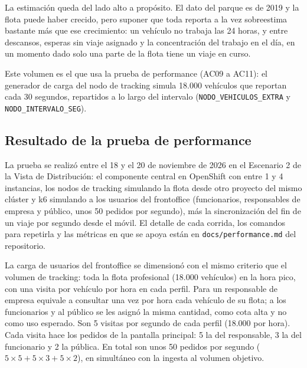 La estimación queda del lado alto a propósito. El dato del parque es de 2019 y la flota puede haber crecido, pero suponer que toda reporta a la vez sobreestima bastante más que ese crecimiento: un vehículo no trabaja las 24 horas, y entre descansos, esperas sin viaje asignado y la concentración del trabajo en el día, en un momento dado solo una parte de la flota tiene un viaje en curso.

Este volumen es el que usa la prueba de performance (AC09 a AC11): el generador de carga del nodo de tracking simula 18.000 vehículos que reportan cada 30 segundos, repartidos a lo largo del intervalo (\texttt{NODO\_VEHICULOS\_EXTRA} y \texttt{NODO\_INTERVALO\_SEG}).

\subsection{Resultado de la prueba de performance}\label{sec:resultado-performance}

La prueba se realizó entre el 18 y el 20 de noviembre de 2026 en el Escenario 2 de la Vista de Distribución: el componente central en OpenShift con entre 1 y 4 instancias, los nodos de tracking simulando la flota desde otro proyecto del mismo clúster y k6 simulando a los usuarios del frontoffice (funcionarios, responsables de empresa y público, unos 50 pedidos por segundo), más la sincronización del fin de un viaje por segundo desde el móvil. El detalle de cada corrida, los comandos para repetirla y las métricas en que se apoya están en \texttt{docs/performance.md} del repositorio.

La carga de usuarios del frontoffice se dimensionó con el mismo criterio que el volumen de tracking: toda la flota profesional (18.000 vehículos) en la hora pico, con una visita por vehículo por hora en cada perfil. Para un responsable de empresa equivale a consultar una vez por hora cada vehículo de su flota; a los funcionarios y al público se les asignó la misma cantidad, como cota alta y no como uso esperado. Son 5 visitas por segundo de cada perfil (18.000 por hora). Cada visita hace los pedidos de la pantalla principal: 5 la del responsable, 3 la del funcionario y 2 la pública. En total son unos 50 pedidos por segundo ($5 \times 5 + 5 \times 3 + 5 \times 2$), en simultáneo con la ingesta al volumen objetivo.

